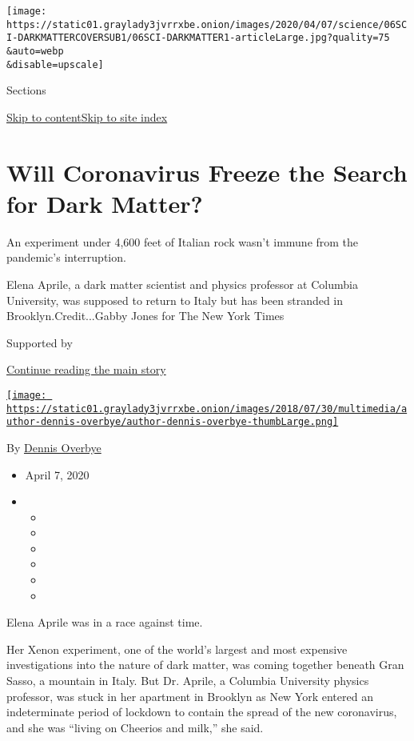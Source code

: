 \texttt{[image: https://static01.graylady3jvrrxbe.onion/images/2020/04/07/science/06SCI-DARKMATTERCOVERSUB1/06SCI-DARKMATTER1-articleLarge.jpg?quality=75\\\&auto=webp\\\&disable=upscale]}

Sections

\protect\hyperlink{site-content}{Skip to
content}\protect\hyperlink{site-index}{Skip to site index}

\hypertarget{will-coronavirus-freeze-the-search-for-dark-matter}{%
\section{Will Coronavirus Freeze the Search for Dark
Matter?}\label{will-coronavirus-freeze-the-search-for-dark-matter}}

An experiment under 4,600 feet of Italian rock wasn't immune from the
pandemic's interruption.

Elena Aprile, a dark matter scientist and physics professor at Columbia
University, was supposed to return to Italy but has been stranded in
Brooklyn.Credit...Gabby Jones for The New York Times

Supported by

\protect\hyperlink{after-sponsor}{Continue reading the main story}

\href{https://www.nytimes3xbfgragh.onion/by/dennis-overbye}{\texttt{[image: https://static01.graylady3jvrrxbe.onion/images/2018/07/30/multimedia/author-dennis-overbye/author-dennis-overbye-thumbLarge.png]}}

By \href{https://www.nytimes3xbfgragh.onion/by/dennis-overbye}{Dennis
Overbye}

\begin{itemize}
\item
  April 7, 2020
\item
  \begin{itemize}
  \item
  \item
  \item
  \item
  \item
  \item
  \end{itemize}
\end{itemize}

Elena Aprile was in a race against time.

Her Xenon experiment, one of the world's largest and most expensive
investigations into the nature of dark matter, was coming together
beneath Gran Sasso, a mountain in Italy. But Dr. Aprile, a Columbia
University physics professor, was stuck in her apartment in Brooklyn as
New York entered an indeterminate period of lockdown to contain the
spread of the new coronavirus, and she was ``living on Cheerios and
milk,'' she said.

